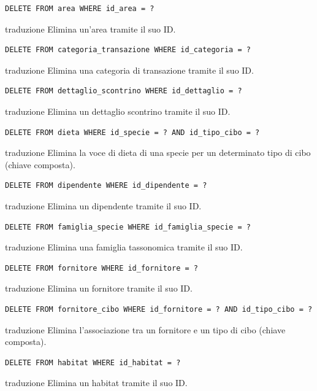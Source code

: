 \documentclass[12pt,a4paper]{report}
\begin{document}
\begin{lstlisting}[style=sqlstyle]
DELETE FROM area WHERE id_area = ?
\end{lstlisting}
traduzione {Elimina un'area tramite il suo ID.}

\begin{lstlisting}[style=sqlstyle]
DELETE FROM categoria_transazione WHERE id_categoria = ?
\end{lstlisting}
traduzione {Elimina una categoria di transazione tramite il suo ID.}

\begin{lstlisting}[style=sqlstyle]
DELETE FROM dettaglio_scontrino WHERE id_dettaglio = ?
\end{lstlisting}
traduzione {Elimina un dettaglio scontrino tramite il suo ID.}

\begin{lstlisting}[style=sqlstyle]
DELETE FROM dieta WHERE id_specie = ? AND id_tipo_cibo = ?
\end{lstlisting}
traduzione {Elimina la voce di dieta di una specie per un determinato tipo di cibo (chiave composta).}

\begin{lstlisting}[style=sqlstyle]
DELETE FROM dipendente WHERE id_dipendente = ?
\end{lstlisting}
traduzione {Elimina un dipendente tramite il suo ID.}

\begin{lstlisting}[style=sqlstyle]
DELETE FROM famiglia_specie WHERE id_famiglia_specie = ?
\end{lstlisting}
traduzione {Elimina una famiglia tassonomica tramite il suo ID.}

\begin{lstlisting}[style=sqlstyle]
DELETE FROM fornitore WHERE id_fornitore = ?
\end{lstlisting}
traduzione {Elimina un fornitore tramite il suo ID.}

\begin{lstlisting}[style=sqlstyle]
DELETE FROM fornitore_cibo WHERE id_fornitore = ? AND id_tipo_cibo = ?
\end{lstlisting}
traduzione {Elimina l'associazione tra un fornitore e un tipo di cibo (chiave composta).}

\begin{lstlisting}[style=sqlstyle]
DELETE FROM habitat WHERE id_habitat = ?
\end{lstlisting}
traduzione {Elimina un habitat tramite il suo ID.}
\end{document}
